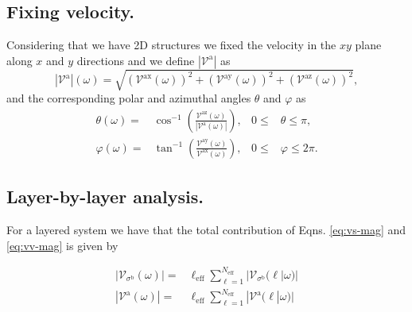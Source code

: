 \documentclass[prb,11pt,tightenlines,twocolumn,aps]{revtex4-1}
\begin{document}

\subsection{Fixing velocity.}\label{sec:theory-fixvel}
Considering that we have 2D structures we fixed the velocity in the $xy$ plane
along $x$ and $y$ directions and we define $|\mathcal{V}^{\mathrm{a}}|$ as
\begin{equation}
|\mathcal{V}^{\mathrm{a}}| (\omega)= 
\sqrt {
(\mathcal{V}^{\mathrm{ax}}(\omega))^{2} +
(\mathcal{V}^{\mathrm{ay}}(\omega))^{2} +
(\mathcal{V}^{\mathrm{az}}(\omega))^{2} 
},
\label{eq:vv-mag}
\end{equation}
and the corresponding polar and azimuthal angles $\theta$ and $\varphi$ as
\begin{align}
\theta  (\omega)
=& 
\cos^{-1} \left( \frac{\mathcal{V}^{\mathrm{az}}(\omega)}
{|\mathcal{V}^{\mathrm{a}}(\omega)|} \right),
& 0 \leq &\theta \leq \pi, 
\label{eq:polar-ang}
\\
\varphi (\omega)
=& 
\tan^{-1} \left( \frac{\mathcal{V}^{\mathrm{ay}}(\omega)}
{\mathcal{V}^{\mathrm{ax}}(\omega)} \right),
& 0 \leq &\varphi \leq 2\pi.
\label{eq:azimuthal-ang} 
\end{align}

\subsection{Layer-by-layer analysis.}\label{sec:theory-layer}

For a layered system we have that the total contribution of Eqns. 
\eqref{eq:vs-mag} and \eqref{eq:vv-mag} is given \cite{arzatePRB14} by 

\begin{align}
|\mathcal{V}_{\sigma^{\mathrm{b}}}(\omega)|
=& 
\ell_{\mathrm{eff}}
\sum_{\ell=1}^{N_{\mathrm{eff}}}
|\mathcal{V}_{\sigma^{\mathrm{b}}} (\ell | \omega)|
\label{eq:vs-layer}
\\
|\mathcal{V}^{\mathrm{a}}(\omega)|
=&
\ell_{\mathrm{eff}}
\sum_{\ell=1}^{N_{\mathrm{eff}}}
|\mathcal{V}^{\mathrm{a}} (\ell | \omega)|
\label{eq:vv-layer}
\end{align}



\end{document}
